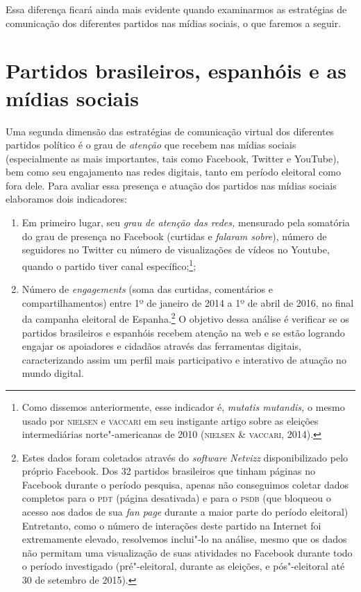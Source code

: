 Essa diferença ficará ainda mais evidente quando examinarmos as
estratégias de comunicação dos diferentes partidos nas mídias sociais, o
que faremos a seguir.

\section{Partidos brasileiros, espanhóis e as mídias sociais}

Uma segunda dimensão das estratégias de comunicação virtual dos
diferentes partidos político é o grau de \textit{atenção} que recebem nas
mídias sociais (especialmente as mais importantes, tais como Facebook,
Twitter e YouTube), bem como seu engajamento nas redes digitais, tanto
em período eleitoral como fora dele. Para avaliar essa presença e
atuação dos partidos nas mídias sociais elaboramos dois indicadores: 

\begin{enumerate}

\item
Em primeiro lugar, seu \textit{grau de atenção das redes,} mensurado pela
somatória do grau de presença no Facebook (curtidas e \textit{falaram sobre}), 
número de seguidores no Twitter cu número de visualizações de vídeos no
Youtube, quando o partido tiver canal específico;\footnote{Como dissemos
  anteriormente, esse indicador é, \textit{mutatis mutandis,} o mesmo
  usado por \textsc{nielsen} e \textsc{vaccari} em seu instigante artigo sobre as eleições
  intermediárias norte"-americanas de 2010 (\textsc{nielsen \& vaccari}, 2014).};

\item Número de \textit{engagements} (soma das curtidas, comentários e
compartilhamentos) entre 1º de janeiro de 2014 a 1º de abril de 2016, no
final da campanha eleitoral de Espanha.\footnote{Estes dados foram
  coletados através do \textit{\textit{software}} \textit{Netvizz} disponibilizado pelo
  próprio Facebook. Dos 32 partidos brasileiros que tinham páginas no
  Facebook durante o período pesquisa, apenas não conseguimos coletar
  dados completos para o \textsc{pdt} (página desativada) e para o \textsc{psdb} (que
  bloqueou o acesso aos dados de sua \textit{fan page} durante a maior
  parte do período eleitoral) Entretanto, como o número de interações
  deste partido na Internet foi extremamente elevado, resolvemos
  inclui"-lo na análise, mesmo que os dados não permitam uma visualização
  de suas atividades no Facebook durante todo o período investigado
  (pré"-eleitoral, durante as eleições, e pós"-eleitoral até 30 de
  setembro de 2015).} O objetivo dessa análise é verificar se os
partidos brasileiros e espanhóis recebem atenção na web e se estão
logrando engajar os apoiadores e cidadãos através das ferramentas
digitais, caracterizando assim um perfil mais participativo e interativo
de atuação no mundo digital.

\end{enumerate}

